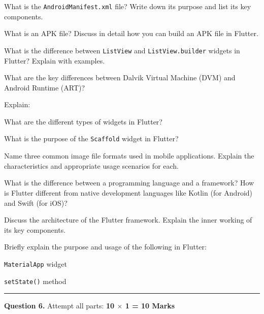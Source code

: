 \documentclass[11pt,a4paper]{article}
\begin{document}
\begin{parts}
  \item What is the   \texttt{AndroidManifest.xml} file? Write down its purpose and list its key components.
  \item What is an APK file? Discuss in detail how you can build an APK file in Flutter.
  \item What is the difference between   \texttt{ListView} and   \texttt{ListView.builder} widgets in Flutter? Explain with examples.
  \item What are the key differences between Dalvik Virtual Machine (DVM) and Android Runtime (ART)?
  \item Explain:
  
\begin{parts}
    \item What are the different types of widgets in Flutter?
    \item What is the purpose of the   \texttt{Scaffold} widget in Flutter?
  \end{parts}
  \item Name three common image file formats used in mobile applications. Explain the characteristics and appropriate usage scenarios for each.
  \item What is the difference between a programming language and a framework? How is Flutter different from native development languages like Kotlin (for Android) and Swift (for iOS)?
  \item Discuss the architecture of the Flutter framework. Explain the inner working of its key components.
  \item Briefly explain the purpose and usage of the following in Flutter:
  
\begin{parts}
    \item   \texttt{MaterialApp} widget
    \item   \texttt{setState()} method
  \end{parts}
\end{parts}

\bigskip


\rule{\linewidth}{0.4pt}\smallskip




\noindent   \textbf{Question 6.} Attempt all parts: \hfill   \textbf{10 $ \times$ 1 = 10 Marks}
\end{document}
